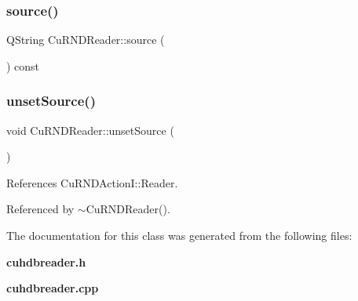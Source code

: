 \mbox{\label{classCuHdbReader_ab27199a9339ecb38a9f5566525ec29cd}} 
\subsubsection{source()}
{\footnotesize\ttfamily Q\+String Cu\+R\+N\+D\+Reader\+::source (\begin{DoxyParamCaption}{ }\end{DoxyParamCaption}) const}

\mbox{\label{classCuHdbReader_a8bbcc7a3c9401955958694cd9a22ac44}} 
\subsubsection{unsetSource()}
{\footnotesize\ttfamily void Cu\+R\+N\+D\+Reader\+::unset\+Source (\begin{DoxyParamCaption}{ }\end{DoxyParamCaption})}



References Cu\+R\+N\+D\+Action\+I\+::\+Reader.



Referenced by $\sim$\+Cu\+R\+N\+D\+Reader().



The documentation for this class was generated from the following files\+:\begin{DoxyCompactItemize}
\item 
\textbf{ cuhdbreader.\+h}\item 
\textbf{ cuhdbreader.\+cpp}\end{DoxyCompactItemize}
